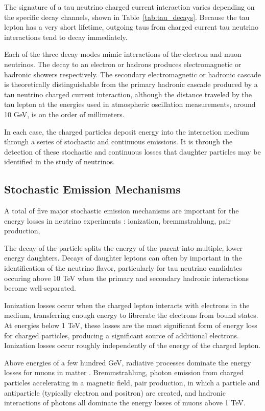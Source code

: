 The signature of a tau neutrino charged current interaction varies depending on the specific decay channels, shown in Table~\ref{tab:tau_decays}.
Because the tau lepton has a very short lifetime, outgoing taus from charged current tau neutrino interactions tend to decay immediately.

Each of the three decay modes mimic interactions of the electron and muon neutrinos.
The decay to an electron or hadrons produces electromagnetic or hadronic showers respectively.
The secondary electromagnetic or hadronic cascade is theoretically distinguishable from the primary hadronic cascade produced by a tau neutrino charged current interaction, although the distance traveled by the tau lepton at the energies used in atmospheric oscillation measurements, around 10 GeV, is on the order of millimeters.

In each case, the charged particles deposit energy into the interaction medium through a series of stochastic and continuous emissions.
It is through the detection of these stochastic and continuous losses that daughter particles may be identified in the study of neutrinos.

\subsection{Stochastic Emission Mechanisms}
A total of five major stochastic emission mechanisms are important for the energy losses in neutrino experiments \cite{Dima-MMC}:
ionization, bremmstrahlung, pair production, 

The decay of the particle splits the energy of the parent into multiple, lower energy daughters.
Decays of daughter leptons can often by important in the identification of the neutrino flavor, particularly for tau neutrino candidates occuring above 10 TeV when the primary and secondary hadronic interactions become well-separated.

Ionization losses occur when the charged lepton interacts with electrons in the medium, transferring enough energy to librerate the electrons from bound states.
At energies below 1 TeV, these losses are the most significant form of energy loss for charged particles, producing a significant source of additional electrons.
Ionization losses occur roughly independently of the energy of the charged lepton.

Above energies of a few hundred GeV, radiative processes dominate the energy losses for muons in matter \cite{PDG-2015}.
Bremmstrahlung, photon emission from charged particles accelerating in a magnetic field, pair production, in which a particle and antiparticle (typically electron and positron) are created, and hadronic interactions of photons all dominate the energy losses of muons above 1 TeV.


